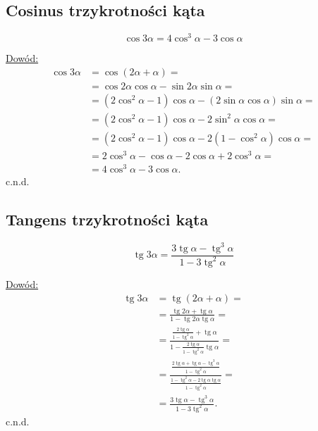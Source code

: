 \documentclass[12pt,a4paper,fleqn]{article}
\DeclareMathOperator{\tg}{tg}
\begin{document}
	\subsection{Cosinus trzykrotności kąta}
		\begin{equation*}
			\cos3\alpha = 4\cos^3\alpha -3\cos\alpha
		\end{equation*}
		
		\underline{Dowód:} \noindent
		\begin{align*}
			\cos3\alpha &= \cos(2\alpha+\alpha) =\\
						&= \cos2\alpha\cos\alpha - \sin2\alpha\sin\alpha = \\
						&= (2\cos^2\alpha - 1)\cos\alpha - (2\sin\alpha\cos\alpha)\sin\alpha = \\
						&= (2\cos^2\alpha - 1)\cos\alpha - 2\sin^2\alpha\cos\alpha =\\
						&= (2\cos^2\alpha - 1)\cos\alpha - 2(1-\cos^2\alpha)\cos\alpha =\\
						&= 2\cos^3\alpha - \cos\alpha - 2\cos\alpha + 2\cos^3\alpha =\\
						&= 4\cos^3\alpha -3\cos\alpha.
		\end{align*}
		c.n.d.

	\subsection{Tangens trzykrotności kąta}
		\begin{equation*}
			\tg3\alpha = \frac{3\tg\alpha-\tg^3\alpha}{1-3\tg^2\alpha}
		\end{equation*}
		
		\underline{Dowód:} \noindent
		\begin{align*}
			\tg3\alpha &= \tg(2\alpha + \alpha) = \\
					   &= \frac{\tg2\alpha+\tg\alpha}{1-\tg2\alpha\tg\alpha} = \\
					   &= \frac{\frac{2\tg \alpha}{1 - \tg^2 \alpha}+\tg\alpha}{1-\frac{2\tg \alpha}{1 - \tg^2 \alpha}\tg\alpha} = \\
					   & = \frac{\frac{2\tg\alpha+\tg\alpha-\tg^3\alpha}{1-\tg^2\alpha}}{\frac{1-\tg^2\alpha - 2\tg\alpha\tg\alpha}{1-\tg^2\alpha}} =\\
					   & = \frac{3\tg\alpha-\tg^3\alpha}{1-3\tg^2\alpha}.
		\end{align*}
		c.n.d.
\end{document}
